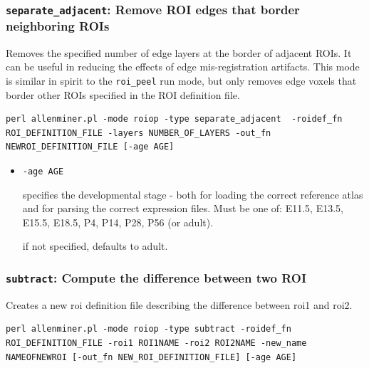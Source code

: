 \documentclass[10pt]{article}
\begin{document}
\subsubsection*{{\tt separate\_adjacent}: Remove ROI edges that border neighboring ROIs}

Removes the specified number of edge layers at the border of adjacent ROIs. It can be useful in reducing the effects of edge mis-registration artifacts. This mode is similar in spirit to the {\tt roi\_peel} run mode, but only removes edge voxels that border other ROIs specified in the ROI definition file.

\begin{lstlisting}
perl allenminer.pl -mode roiop -type separate_adjacent  -roidef_fn ROI_DEFINITION_FILE -layers NUMBER_OF_LAYERS -out_fn NEWROI_DEFINITION_FILE [-age AGE]
\end{lstlisting}

\begin{itemize}
\item {\tt -age AGE}

specifies the developmental stage - both for loading the correct reference atlas and for parsing the correct expression files. Must be one of: E11.5, E13.5, E15.5, E18.5, P4, P14, P28, P56 (or adult).

if not specified, defaults to adult.
\end{itemize}

\subsubsection*{{\tt subtract}: Compute the difference between two ROI}

Creates a new roi definition file describing the difference between roi1 and roi2.

\begin{lstlisting}
perl allenminer.pl -mode roiop -type subtract -roidef_fn ROI_DEFINITION_FILE -roi1 ROI1NAME -roi2 ROI2NAME -new_name NAMEOFNEWROI [-out_fn NEW_ROI_DEFINITION_FILE] [-age AGE]
\end{lstlisting}
\end{document}
